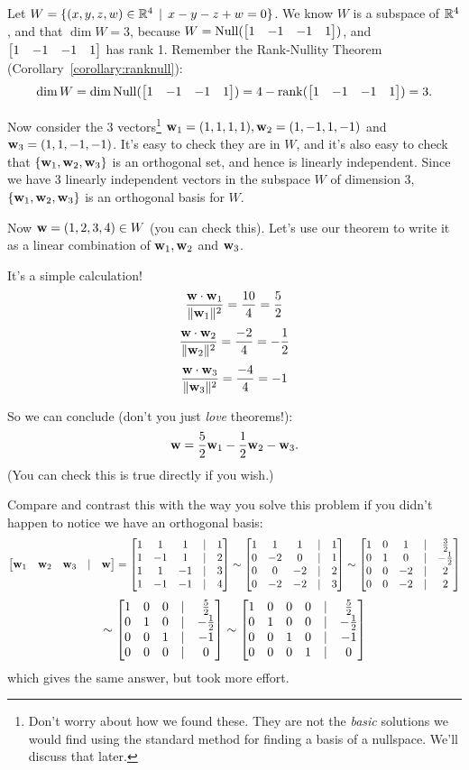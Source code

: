 \begin{myexample}
Let $W=\{(x,y,z,w) \in \mathbb{R}^4 \,\mid \, x-y-z+w=0 \}$. We know $W$ is a subspace of $\mathbb{R}^4$, and that $\dim W=3$, because $W=\Null(\bmatrix1&-1&-1&1 \endbmatrix)$, and $\bmatrix1&-1&-1&1 \endbmatrix$ has rank 1. Remember the Rank-Nullity Theorem (Corollary~\ref{corollary:ranknull}): $$\dim W= \dim \Null(\bmatrix1&-1&-1&1 \endbmatrix)=4-\rank(\bmatrix1&-1&-1&1 \endbmatrix)=3.$$

 Now consider the 3 vectors\footnote{Don't worry about how we found these. They are not the {\it basic} solutions we would find using the standard method for finding a basis of a nullspace.  We'll discuss that later.}  $\mathbf{w}_1=(1,1,1,1), \mathbf{w}_2=(1,-1,1,-1)$ and $ \mathbf{w}_3=(1,1,-1,-1)$. It's easy to check they are in $W$, and it's also easy to check that $\{\mathbf{w}_1,\mathbf{w}_2,\mathbf{w}_3 \}$ is an orthogonal set, and hence is linearly independent. Since we have 3 linearly independent vectors in the subspace $W$ of dimension 3, $\{\mathbf{w}_1,\mathbf{w}_2,\mathbf{w}_3 \}$  is an orthogonal basis for $W$.

Now   $\mathbf{w} = (1,2,3,4) \in W$ (you can check this). Let's use our theorem to  write it  as a linear combination of
 $ \mathbf{w}_1,\mathbf{w}_2$ and $\mathbf{w}_3$.



  It's a simple calculation!
$$
\frac{\mathbf{w}\cdot \mathbf{w}_1}{\|\mathbf{w}_1\|^2} = \frac{10}{4} = \frac52
$$
$$
\frac{\mathbf{w}\cdot \mathbf{w}_2}{\|\mathbf{w}_2\|^2} = \frac{-2}{4} = -\frac12
$$
$$
\frac{\mathbf{w}\cdot \mathbf{w}_3}{\|\mathbf{w}_3\|^2} = \frac{-4}{4} = -1
$$

So we can conclude (don't you just {\it love} theorems!):
$$
\mathbf{w} = \frac52\mathbf{w}_1 - \frac12\mathbf{w}_2 - \mathbf{w}_3.
$$
(You can check this is true directly if you wish.)

Compare and contrast this with the way you solve this problem if
you didn't happen to notice we have an orthogonal basis:
$$ \left[ \begin{matrix} \mathbf{w}_1 &\mathbf{w}_2 &\mathbf{w}_3&|&\mathbf{w} \end{matrix} \right]=
\left[ \begin{matrix} 
1 & 1  & 1 &   |& 1\\
1 & -1 & 1 &   |& 2\\
1 & 1  & -1 &   |& 3\\
1 & -1 & -1 &   |& 4 \end{matrix} \right]
\sim
\left[ \begin{matrix} 
1 & 1  & 1 &   |& 1\\
0 & -2 & 0 &   |& 1\\
0 & 0  & -2 &   |& 2\\
0 & -2 & -2 &  |& 3 \end{matrix} \right]
\sim
\left[ \begin{matrix} 
1 & 0  &  1 &   |& \frac32\\
0 & 1 &   0 &  |& -\frac12\\
0 & 0  & -2 &   |& 2\\
0 & 0 & -2 &   |& 2 \end{matrix} \right]
$$
$$
\sim
\left[ \begin{matrix} 
1 & 0  &  0 &   |& \frac52\\
0 & 1 &   0 &   |& -\frac12\\
0 & 0  & 1 &   |& -1\\
0 & 0 & 0 &   |& 0 \end{matrix} \right]
\sim
\left[ \begin{matrix} 
1 & 0  &  0 & 0 & |& \frac52\\
0 & 1 &   0 & 0 & |& -\frac12\\
0 & 0  & 1 & 0 & |& -1\\
0 & 0 & 0 & 1 & |& 0 \end{matrix} \right]
$$
which gives the same answer, but took more effort.
\end{myexample}

